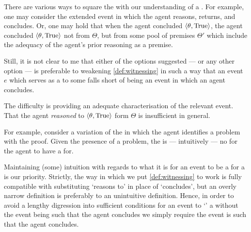 \begin{note}
  There are various ways to square the  with our understanding of a .
  For example, one may consider the extended event in which the agent reasons, returns, and concludes.
  Or, one may hold that when the agent concluded \(\langle \theta, \text{True} \rangle\), the agent concluded \(\langle \theta, \text{True} \rangle\) not from \(\Theta\), but from some pool of premises \(\Theta'\) which include the adequacy of the agent's prior reasoning as a premise.

  Still, it is not clear to me that either of the options suggested --- or any other option --- is preferable to weakening \autoref{def:witnessing} in such a way that an event \(e\) which serves as a \wit{} to some \ros{} falls short of being an event in which an agent concludes.

  The difficulty is providing an adequate characterisation of the relevant event.
  That the agent \emph{reasoned} to \(\langle \theta, \text{True} \rangle\) form \(\Theta\) is insufficient in general.

  For example, consider a variation of the \scen{} in which the agent identifies a problem with the proof.
  Given the presence of a problem, the is --- intuitively --- no \ros{} for the agent to have a  for.

  Maintaining (some) intuition with regards to what it is for an event to be a  for a  is our priority.
  Strictly, the way in which we put \autoref{def:witnessing} to work is fully compatible with substituting `reasons to' in place of `concludes', but an overly narrow definition is preferably to an unintuitive definition.
  Hence, in order to avoid a lengthy digression into sufficient conditions for an event to `' a \ros{} without the event being such that the agent concludes we simply require the event is such that the agent concludes.
\end{note}

\subsection{\supportII{}}
\label{cha:var:support:II}


